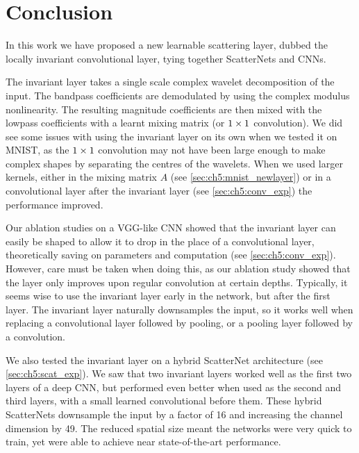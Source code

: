 \section{Conclusion}\label{sec:ch5:conclusion}
In this work we have proposed a new learnable scattering layer, dubbed the
locally invariant convolutional layer, tying together ScatterNets and CNNs.

The invariant layer takes a single scale complex wavelet decomposition of the
input. The bandpass coefficients are demodulated by using the complex modulus
nonlinearity. The resulting magnitude coefficients are then mixed with the
lowpass coefficients with a learnt mixing matrix (or $1\times 1$ convolution). 
We did see some issues with using the invariant layer on its own when we tested
it on MNIST, as the $1\times 1$ convolution may not have been large enough to
make complex shapes by separating the centres of the wavelets. When we used
larger kernels, either in the mixing matrix $A$ (see \autoref{sec:ch5:mnist_newlayer}) or in a convolutional layer
after the invariant layer (see \autoref{sec:ch5:conv_exp}) the performance improved.

Our ablation studies on a VGG-like CNN showed that the invariant layer can
easily be shaped to allow it to drop in the place of a convolutional layer,
theoretically saving on parameters and computation (see \autoref{sec:ch5:conv_exp}).
However, care must be taken when doing this, as our ablation study showed that
the layer only improves upon regular convolution at certain depths.  Typically,
it seems wise to use the invariant layer early in the network, but after the
first layer. The invariant layer naturally downsamples the input, so it works
well when replacing a convolutional layer followed by pooling, or a pooling
layer followed by a convolution. 

We also tested the invariant layer on a hybrid ScatterNet architecture (see
\autoref{sec:ch5:scat_exp}). We saw that two invariant layers worked well as the
first two layers of a deep CNN, but performed even better when used as the
second and third layers, with a small learned convolutional before them. These
hybrid ScatterNets downsample the input by a factor of 16 and increasing the
channel dimension by 49. The reduced spatial size meant the networks were very
quick to train, yet were able to achieve near state-of-the-art performance.


